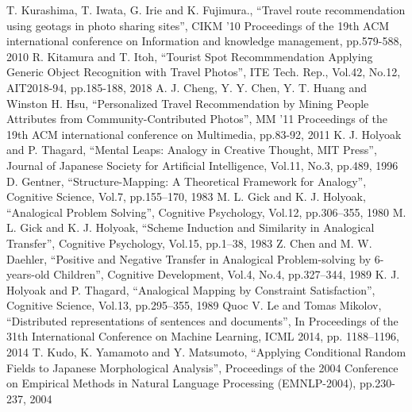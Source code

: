 \documentclass[journal]{IAENGtran}
\begin{document}
%
%
%
\begin{thebibliography}{1}
    T. Kurashima, T. Iwata, G. Irie and K. Fujimura.,
      ``Travel route recommendation using geotags in photo sharing sites'',
      CIKM '10 Proceedings of the 19th ACM international conference on Information and knowledge management, pp.579-588, 2010
    R. Kitamura and T. Itoh,
      ``Tourist Spot Recommmendation Applying Generic Object Recognition with Travel Photos'',
      ITE Tech. Rep., Vol.42, No.12, AIT2018-94, pp.185-188, 2018
    A. J. Cheng, Y. Y. Chen, Y. T. Huang and Winston H. Hsu,
      ``Personalized Travel Recommendation by Mining People Attributes from Community-Contributed Photos'',
      MM '11 Proceedings of the 19th ACM international conference on Multimedia, pp.83-92, 2011
    K. J. Holyoak and P. Thagard,
      ``Mental Leaps: Analogy in Creative Thought, MIT Press'',
      Journal of Japanese Society for Artificial Intelligence,  Vol.11, No.3,  pp.489, 1996
    D. Gentner,
      ``Structure-Mapping: A Theoretical Framework for Analogy'',
      Cognitive Science, Vol.7, pp.155–170, 1983
    M. L. Gick and K. J. Holyoak,
      ``Analogical Problem Solving'',
      Cognitive Psychology, Vol.12, pp.306–355, 1980
    M. L. Gick and K. J. Holyoak,
      ``Scheme Induction and Similarity in Analogical Transfer'',
      Cognitive Psychology, Vol.15, pp.1–38, 1983
    Z. Chen and M. W. Daehler,
      ``Positive and Negative Transfer in Analogical Problem-solving by 6-years-old Children'',
      Cognitive Development, Vol.4, No.4, pp.327–344, 1989
    K. J. Holyoak and P. Thagard,
      ``Analogical Mapping by Constraint Satisfaction'',
      Cognitive Science, Vol.13, pp.295–355, 1989
    Quoc V. Le and Tomas Mikolov,
      ``Distributed representations of sentences and documents'',
      In Proceedings of the 31th International Conference on Machine Learning, ICML 2014, pp. 1188–1196, 2014
    T. Kudo, K. Yamamoto and Y. Matsumoto,
    ``Applying Conditional Random Fields to Japanese Morphological Analysis'',
    Proceedings of the 2004 Conference on Empirical Methods in Natural Language Processing (EMNLP-2004), pp.230-237, 2004

\end{thebibliography}
\end{document}
